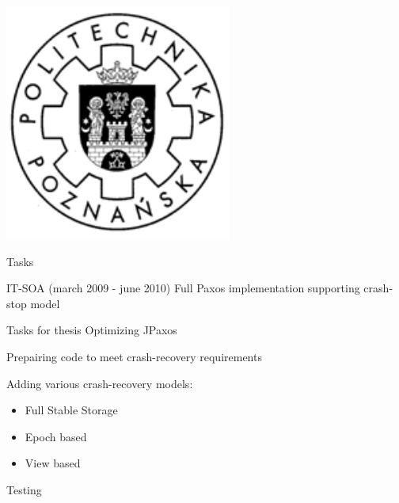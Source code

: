 \documentclass[hyperref={pdfpagelabels=true},11pt,compress,trans]{beamer}
\begin{document}
  \logo
  {
    \includegraphics[keepaspectratio,height=0.12\textheight]{images/put_logo.pdf} \hspace*{1em}
  }

\begin{frame}{Tasks}
 \begin{block}{IT-SOA (march 2009 - june 2010)}
  Full Paxos implementation supporting crash-stop model
 \end{block}

 \begin{block}{Tasks for thesis}
  Optimizing JPaxos
  
  Prepairing code to meet crash-recovery requirements
  
  Adding various crash-recovery models: \vspace{-\parsep}
  \begin{itemize} 
   \item Full Stable Storage
   \item Epoch based
   \item View based
  \end{itemize}

  Testing
 \end{block}
\end{frame}
\end{document}
